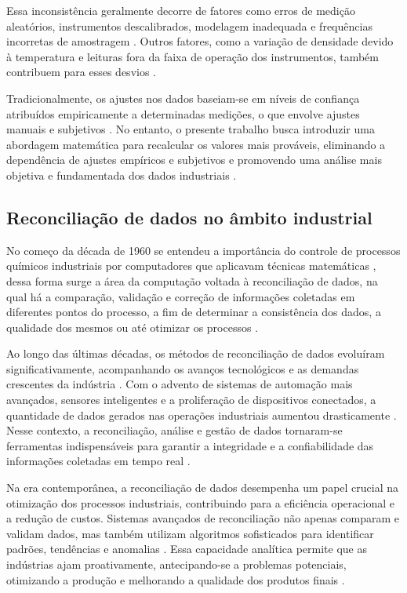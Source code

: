 Essa inconsistência geralmente decorre de fatores como erros de medição aleatórios, instrumentos descalibrados, modelagem inadequada e frequências incorretas de amostragem \cite{measurementerror2020}. Outros fatores, como a variação de densidade devido à temperatura e leituras fora da faixa de operação dos instrumentos, também contribuem para esses desvios \cite{temperaturedensity2022}.

Tradicionalmente, os ajustes nos dados baseiam-se em níveis de confiança atribuídos empiricamente a determinadas medições, o que envolve ajustes manuais e subjetivos \cite{empiricaladjustment2023}. No entanto, o presente trabalho busca introduzir uma abordagem matemática para recalcular os valores mais prováveis, eliminando a dependência de ajustes empíricos e subjetivos e promovendo uma análise mais objetiva e fundamentada dos dados industriais \cite{mathematicalapproach2024}.

\subsection{Reconciliação de dados no âmbito industrial}

No começo da década de 1960 se entendeu a importância do controle de processos químicos industriais por computadores que aplicavam técnicas matemáticas \cite{computecontrol}, dessa forma surge a área da computação voltada à reconciliação de dados, na qual há a comparação, validação e correção de informações coletadas em diferentes pontos do processo, a fim de determinar a consistência dos dados, a qualidade dos mesmos ou até otimizar os processos \cite{datarecshakar}.

Ao longo das últimas décadas, os métodos de reconciliação de dados evoluíram significativamente, acompanhando os avanços tecnológicos e as demandas crescentes da indústria \cite{datarecsurvey}. Com o advento de sistemas de automação mais avançados, sensores inteligentes e a proliferação de dispositivos conectados, a quantidade de dados gerados nas operações industriais aumentou drasticamente \cite{datarecsurvey}. Nesse contexto, a reconciliação, análise e gestão de dados tornaram-se ferramentas indispensáveis para garantir a integridade e a confiabilidade das informações coletadas em tempo real \cite{aularecon}.

Na era contemporânea, a reconciliação de dados desempenha um papel crucial na otimização dos processos industriais, contribuindo para a eficiência operacional e a redução de custos. Sistemas avançados de reconciliação não apenas comparam e validam dados, mas também utilizam algoritmos sofisticados para identificar padrões, tendências e anomalias \cite{datarecragnoli}. Essa capacidade analítica permite que as indústrias ajam proativamente, antecipando-se a problemas potenciais, otimizando a produção e melhorando a qualidade dos produtos finais \cite{datarecshakar}.


